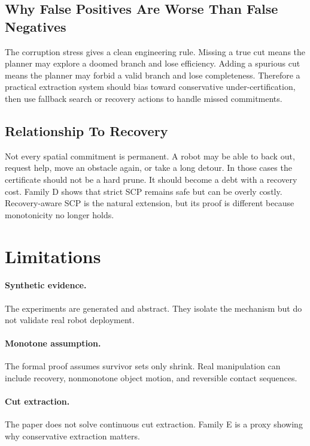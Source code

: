 \documentclass{article}
\begin{document}
\subsection{Why False Positives Are Worse Than False Negatives}

The corruption stress gives a clean engineering rule. Missing a true cut means the planner may explore a doomed branch and lose efficiency. Adding a spurious cut means the planner may forbid a valid branch and lose completeness. Therefore a practical extraction system should bias toward conservative under-certification, then use fallback search or recovery actions to handle missed commitments.

\subsection{Relationship To Recovery}

Not every spatial commitment is permanent. A robot may be able to back out, request help, move an obstacle again, or take a long detour. In those cases the certificate should not be a hard prune. It should become a debt with a recovery cost. Family D shows that strict SCP remains safe but can be overly costly. Recovery-aware SCP is the natural extension, but its proof is different because monotonicity no longer holds.

\section{Limitations}

\paragraph{Synthetic evidence.}
The experiments are generated and abstract. They isolate the mechanism but do not validate real robot deployment.

\paragraph{Monotone assumption.}
The formal proof assumes survivor sets only shrink. Real manipulation can include recovery, nonmonotone object motion, and reversible contact sequences.

\paragraph{Cut extraction.}
The paper does not solve continuous cut extraction. Family E is a proxy showing why conservative extraction matters.
\end{document}
